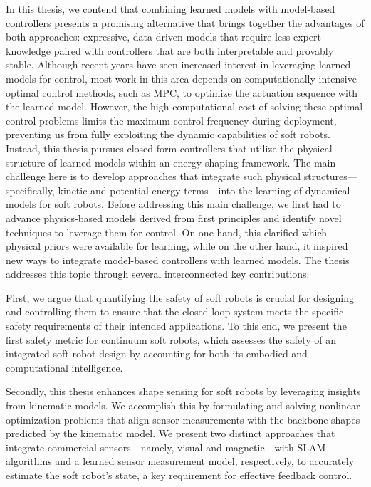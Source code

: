 In this thesis, we contend that combining learned models with model-based controllers presents a promising alternative that brings together the advantages of both approaches: expressive, data-driven models that require less expert knowledge paired with controllers that are both interpretable and provably stable. Although recent years have seen increased interest in leveraging learned models for control, most work in this area depends on computationally intensive optimal control methods, such as MPC, to optimize the actuation sequence with the learned model. However, the high computational cost of solving these optimal control problems limits the maximum control frequency during deployment, preventing us from fully exploiting the dynamic capabilities of soft robots. Instead, this thesis pursues closed-form controllers that utilize the physical structure of learned models within an energy-shaping framework. The main challenge here is to develop approaches that integrate such physical structures—specifically, kinetic and potential energy terms—into the learning of dynamical models for soft robots.
Before addressing this main challenge, we first had to advance physics-based models derived from first principles and identify novel techniques to leverage them for control. On one hand, this clarified which physical priors were available for learning, while on the other hand, it inspired new ways to integrate model-based controllers with learned models.
The thesis addresses this topic through several interconnected key contributions. 

First, we argue that quantifying the safety of soft robots is crucial for designing and controlling them to ensure that the closed-loop system meets the specific safety requirements of their intended applications. To this end, we present the first safety metric for continuum soft robots, which assesses the safety of an integrated soft robot design by accounting for both its embodied and computational intelligence.

Secondly, this thesis enhances shape sensing for soft robots by leveraging insights from kinematic models. We accomplish this by formulating and solving nonlinear optimization problems that align sensor measurements with the backbone shapes predicted by the kinematic model. We present two distinct approaches that integrate commercial sensors—namely, visual and magnetic—with SLAM algorithms and a learned sensor measurement model, respectively, to accurately estimate the soft robot’s state, a key requirement for effective feedback control.

